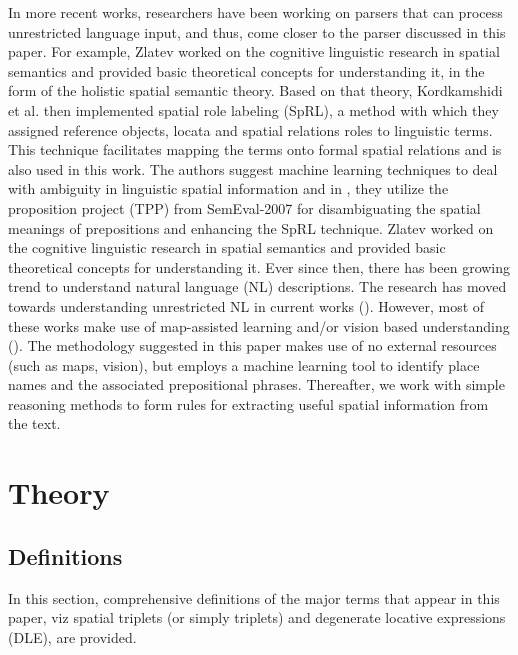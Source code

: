 \documentclass{acm_proc_article-sp}
\begin{document}
In more recent works, researchers have been working on parsers that can process unrestricted language input, and thus, come closer to the parser discussed in this paper. For example, Zlatev \cite{zlatev:semantics} worked on the cognitive linguistic research in spatial semantics and provided basic theoretical concepts for understanding it, in the form of the holistic spatial semantic theory. Based on that theory, Kordkamshidi et al. \cite{kordjamshidi:language} then implemented spatial role labeling (SpRL), a method with which they assigned reference objects, locata and spatial relations roles to linguistic terms. This technique facilitates mapping the terms onto formal spatial relations and is also used in this work. The authors suggest machine learning techniques to deal with ambiguity in linguistic spatial information and in \cite{Kordjamshidi:labelling}, they utilize the proposition project (TPP) from SemEval-2007 \cite{litkowski:semeval} for disambiguating the spatial meanings of prepositions and enhancing the SpRL technique.
Zlatev \cite{zlatev:semantics} worked on the cognitive linguistic research in spatial semantics and provided basic theoretical concepts for understanding it. Ever since then, there has been growing trend to understand natural language (NL) descriptions. The research has moved towards understanding unrestricted NL in current works (\cite{Kordjamshidi:labelling, matuszek:following, tellex:language}). However, most of these works make use of map-assisted learning and/or vision based understanding (\cite{kollar:robotic,levit:interpretation,macmahon:walk}). The methodology suggested in this paper makes use of no external resources (such as maps, vision), but employs a machine learning tool \cite{fei:locative} to identify place names and the associated prepositional phrases. Thereafter, we work with simple reasoning methods to form rules for extracting useful spatial information from the text. 
\section{Theory}
\subsection{Definitions}
In this section, comprehensive definitions of the major terms that appear in this paper, viz spatial triplets (or simply triplets) and degenerate locative expressions (DLE), are provided.
\end{document}
